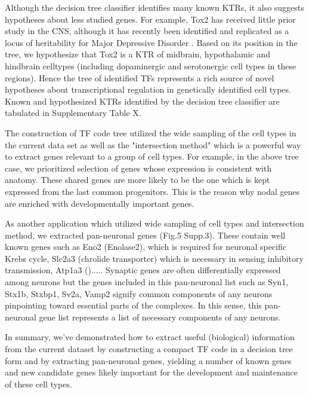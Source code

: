 Although the decision tree classifier identifies many known KTRs, it also suggests hypotheses about less studied genes. For example, Tox2 has received little prior study in the CNS, although it has recently been identified and replicated as a locus of heritability for Major Depressive Disorder \cite{Zeng_2016}. Based on its position in the tree, we hypothesize that Tox2 is a KTR of midbrain, hypothalamic and hindbrain celltypes (including dopaminergic and serotonergic cell types in these regions). Hence the tree of identified TFs represents a rich source of novel hypotheses about transcriptional regulation in genetically identified cell types. Known and hypothesized KTRs identified by the decision tree classifier are tabulated in Supplementary Table X.

The construction of TF code tree utilized the wide sampling of the cell types in the current data set as well as the "intersection method" which is a powerful way to extract genes relevant to a group of cell types. For example, in the above tree case, we prioritized selection of genes whose expression is consistent with anatomy. These shared genes are more likely to be the one which is kept expressed from the last common progenitors. This is the reason why nodal genes are enriched with developmentally important genes.

As another application which utilized wide sampling of cell types and intersection method, we  extracted pan-neuronal genes (Fig.5 Supp.3). These contain well known genes such as Eno2 (Enolase2), which is required for neuronal specific Krebs cycle, Slc2a3 (chrolide transporter) which is necessary in sensing inhibitory transmission, Atp1a3 ().....  Synaptic genes are often differentially expressed among neurons but the genes included in this pan-neuronal list such as Syn1, Stx1b, Stxbp1, Sv2a, Vamp2 signify common components of any neurons pinpointing toward essential parts of the complexes. In this sense, this pan-neuronal gene list represents a list of necessary components of any neurons.

In summary, we've demonstrated how to extract useful (biological) information from the current dataset by constructing a compact TF code in a decision tree form and by extracting pan-neuronal genes, yielding a number of known genes and new candidate genes likely important for the development and maintenance of these cell types.
